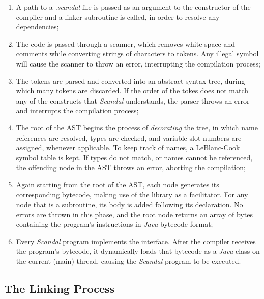 \begin{enumerate}
	\item A path to a \emph{.scandal} file is passed as an argument to the constructor of the compiler and a linker subroutine is called, in order to resolve any dependencies;
	\item The code is passed through a scanner, which removes white space and comments while converting strings of characters to tokens. Any illegal symbol will cause the scanner to throw an error, interrupting the compilation process;
	\item The tokens are parsed and converted into an abstract syntax tree, during which many tokens are discarded. If the order of the tokes does not match any of the constructs that \emph{Scandal} understands, the parser throws an error and interrupts the compilation process;
	\item The root of the AST begins the process of \emph{decorating} the tree, in which name references are resolved, types are checked, and variable slot numbers are assigned, whenever applicable. To keep track of names, a LeBlanc-Cook symbol table is kept. If types do not match, or names cannot be referenced, the offending node in the AST throws an error, aborting the compilation;
	\item Again starting from the root of the AST, each node generates its corresponding bytecode, making use of the  library as a facilitator. For any node that is a subroutine, its body is added following its declaration. No errors are thrown in this phase, and the root node returns an array of bytes containing the program's instructions in \emph{Java} bytecode format;
	\item Every \emph{Scandal} program implements the  interface. After the compiler receives the program's bytecode, it dynamically loads that bytecode as a \emph{Java} class on the current (main) thread, causing the \emph{Scandal} program to be executed.
\end{enumerate}

\subsection{The Linking Process}

